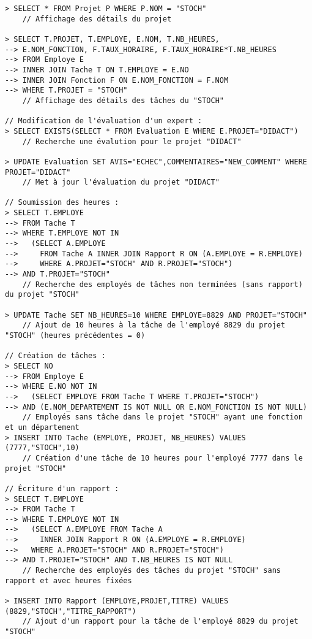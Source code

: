 \begin{verbatim}
> SELECT * FROM Projet P WHERE P.NOM = "STOCH"
    // Affichage des détails du projet

> SELECT T.PROJET, T.EMPLOYE, E.NOM, T.NB_HEURES, 
--> E.NOM_FONCTION, F.TAUX_HORAIRE, F.TAUX_HORAIRE*T.NB_HEURES
--> FROM Employe E 
--> INNER JOIN Tache T ON T.EMPLOYE = E.NO
--> INNER JOIN Fonction F ON E.NOM_FONCTION = F.NOM
--> WHERE T.PROJET = "STOCH"
    // Affichage des détails des tâches du "STOCH"

// Modification de l'évaluation d'un expert :
> SELECT EXISTS(SELECT * FROM Evaluation E WHERE E.PROJET="DIDACT")
    // Recherche une évalution pour le projet "DIDACT"

> UPDATE Evaluation SET AVIS="ECHEC",COMMENTAIRES="NEW_COMMENT" WHERE PROJET="DIDACT"
    // Met à jour l'évaluation du projet "DIDACT"

// Soumission des heures :
> SELECT T.EMPLOYE 
--> FROM Tache T 
--> WHERE T.EMPLOYE NOT IN 
-->   (SELECT A.EMPLOYE 
-->     FROM Tache A INNER JOIN Rapport R ON (A.EMPLOYE = R.EMPLOYE) 
-->     WHERE A.PROJET="STOCH" AND R.PROJET="STOCH")
--> AND T.PROJET="STOCH"
    // Recherche des employés de tâches non terminées (sans rapport) du projet "STOCH"

> UPDATE Tache SET NB_HEURES=10 WHERE EMPLOYE=8829 AND PROJET="STOCH"
    // Ajout de 10 heures à la tâche de l'employé 8829 du projet "STOCH" (heures précédentes = 0)

// Création de tâches :
> SELECT NO 
--> FROM Employe E 
--> WHERE E.NO NOT IN 
-->   (SELECT EMPLOYE FROM Tache T WHERE T.PROJET="STOCH") 
--> AND (E.NOM_DEPARTEMENT IS NOT NULL OR E.NOM_FONCTION IS NOT NULL)
    // Employés sans tâche dans le projet "STOCH" ayant une fonction et un département
> INSERT INTO Tache (EMPLOYE, PROJET, NB_HEURES) VALUES (7777,"STOCH",10)
    // Création d'une tâche de 10 heures pour l'employé 7777 dans le projet "STOCH"

// Écriture d'un rapport :
> SELECT T.EMPLOYE 
--> FROM Tache T 
--> WHERE T.EMPLOYE NOT IN 
-->   (SELECT A.EMPLOYE FROM Tache A 
-->     INNER JOIN Rapport R ON (A.EMPLOYE = R.EMPLOYE) 
-->   WHERE A.PROJET="STOCH" AND R.PROJET="STOCH")
--> AND T.PROJET="STOCH" AND T.NB_HEURES IS NOT NULL
    // Recherche des employés des tâches du projet "STOCH" sans rapport et avec heures fixées

> INSERT INTO Rapport (EMPLOYE,PROJET,TITRE) VALUES (8829,"STOCH","TITRE_RAPPORT")
    // Ajout d'un rapport pour la tâche de l'employé 8829 du projet "STOCH"


\end{verbatim}
